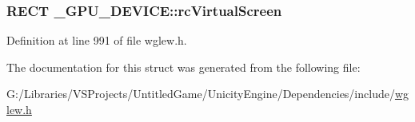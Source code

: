 \subsubsection[{rc\+Virtual\+Screen}]{\setlength{\rightskip}{0pt plus 5cm}R\+E\+C\+T \+\_\+\+G\+P\+U\+\_\+\+D\+E\+V\+I\+C\+E\+::rc\+Virtual\+Screen}\label{struct___g_p_u___d_e_v_i_c_e_aeb573bbeb3b6c589246720ef259b9a27}


Definition at line 991 of file wglew.\+h.



The documentation for this struct was generated from the following file\+:\begin{DoxyCompactItemize}
\item 
G\+:/\+Libraries/\+V\+S\+Projects/\+Untitled\+Game/\+Unicity\+Engine/\+Dependencies/include/\hyperlink{wglew_8h}{wglew.\+h}\end{DoxyCompactItemize}
